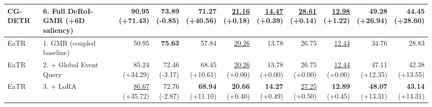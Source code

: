 \documentclass{article}
\begin{document}
{\begin{tabular}{llrrrrrrrrr}
CG-DETR & 6. Full DeRoI-GMR (+6D saliency) & \shortstack{\textbf{90.95} \\ {\scriptsize (+71.43)}} & \shortstack{73.89 \\ {\scriptsize (-0.85)}} & \shortstack{\textbf{71.27} \\ {\scriptsize (+40.56)}} & \shortstack{\underline{21.16} \\ {\scriptsize (+0.18)}} & \shortstack{\underline{14.47} \\ {\scriptsize (+0.39)}} & \shortstack{\underline{28.61} \\ {\scriptsize (+0.14)}} & \shortstack{\underline{12.98} \\ {\scriptsize (+1.22)}} & \shortstack{\textbf{49.28} \\ {\scriptsize (+26.94)}} & \shortstack{\textbf{44.45} \\ {\scriptsize (+28.60)}} \\
\midrule
EaTR & 1. GMR (coupled baseline) & 50.95 & \textbf{75.63} & 57.84 & \underline{20.26} & 13.78 & 26.75 & \underline{12.44} & 34.76 & 28.83 \\
EaTR & 2. + Global Event Query & \shortstack{85.24 \\ {\scriptsize (+34.29)}} & \shortstack{72.46 \\ {\scriptsize (-3.17)}} & \shortstack{68.45 \\ {\scriptsize (+10.61)}} & \shortstack{\underline{20.26} \\ {\scriptsize (+0.00)}} & \shortstack{13.78 \\ {\scriptsize (+0.00)}} & \shortstack{26.75 \\ {\scriptsize (+0.00)}} & \shortstack{\underline{12.44} \\ {\scriptsize (+0.00)}} & \shortstack{47.11 \\ {\scriptsize (+12.35)}} & \shortstack{42.38 \\ {\scriptsize (+13.55)}} \\
EaTR & 3. + LoRA & \shortstack{\underline{86.67} \\ {\scriptsize (+35.72)}} & \shortstack{72.76 \\ {\scriptsize (-2.87)}} & \shortstack{\textbf{68.94} \\ {\scriptsize (+11.10)}} & \shortstack{\textbf{20.66} \\ {\scriptsize (+0.40)}} & \shortstack{\textbf{14.27} \\ {\scriptsize (+0.49)}} & \shortstack{\underline{27.25} \\ {\scriptsize (+0.50)}} & \shortstack{\textbf{12.89} \\ {\scriptsize (+0.45)}} & \shortstack{\textbf{48.07} \\ {\scriptsize (+13.31)}} & \shortstack{\textbf{43.14} \\ {\scriptsize (+14.31)}} \\

\end{tabular}}
\end{document}
